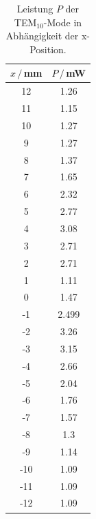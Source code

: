\begin{table}[H]
    \center
    \caption{Leistung $P$ der TEM$_{10}$-Mode in Abhängigkeit der x-Position.}
    \begin{tabular}{c c}
        \toprule
        $x\,/\,$mm & $P\,/\,$mW\\
        \midrule
        12&      1.26\\
        11&      1.15\\
        10&      1.27\\
        9 &      1.27\\
        8 &      1.37\\
        7 &      1.65\\
        6 &      2.32\\
        5 &      2.77\\
        4 &      3.08\\
        3 &      2.71\\
        2 &      2.71\\
        1 &      1.11\\
        0 &      1.47\\
        -1&      2.499\\
        -2&      3.26\\
        -3&      3.15\\
        -4&      2.66\\
        -5&      2.04\\
        -6&      1.76\\
        -7&      1.57\\
        -8&      1.3\\
        -9&      1.14\\
        -10&     1.09\\
        -11&     1.09\\
        -12&     1.09\\
        \bottomrule
    \end{tabular}
    \label{tab:TEM10}
\end{table}

